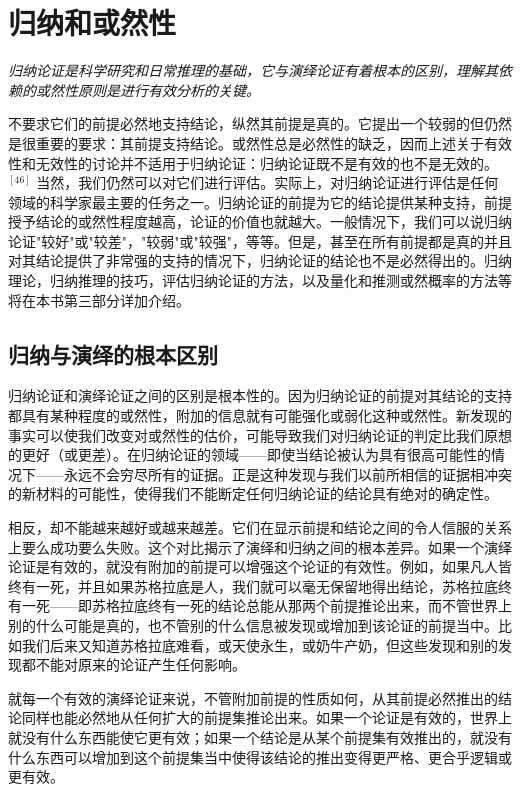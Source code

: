 \section{归纳和或然性}

\begin{logicbox}[title=引言]
\textit{归纳论证是科学研究和日常推理的基础，它与演绎论证有着根本的区别，理解其依赖的或然性原则是进行有效分析的关键。}
\end{logicbox}

不要求它们的前提必然地支持结论，纵然其前提是真的。它提出一个较弱的但仍然是很重要的要求：其前提支持结论。或然性总是必然性的缺乏，因而上述关于有效性和无效性的讨论并不适用于归纳论证：归纳论证既不是有效的也不是无效的。$^{[46]}$ 当然，我们仍然可以对它们进行评估。实际上，对归纳论证进行评估是任何领域的科学家最主要的任务之一。归纳论证的前提为它的结论提供某种支持，前提授予结论的或然性程度越高，论证的价值也就越大。一般情况下，我们可以说归纳论证"较好"或"较差"，"较弱"或"较强"，等等。但是，甚至在所有前提都是真的并且对其结论提供了非常强的支持的情况下，归纳论证的结论也不是必然得出的。归纳理论，归纳推理的技巧，评估归纳论证的方法，以及量化和推测或然概率的方法等将在本书第三部分详加介绍。

\subsection{归纳与演绎的根本区别}

归纳论证和演绎论证之间的区别是根本性的。因为归纳论证的前提对其结论的支持都具有某种程度的或然性，附加的信息就有可能强化或弱化这种或然性。新发现的事实可以使我们改变对或然性的估价，可能导致我们对归纳论证的判定比我们原想的更好（或更差）。在归纳论证的领域——即使当结论被认为具有很高可能性的情况下——永远不会穷尽所有的证据。正是这种发现与我们以前所相信的证据相冲突的新材料的可能性，使得我们不能断定任何归纳论证的结论具有绝对的确定性。

相反，却不能越来越好或越来越差。它们在显示前提和结论之间的令人信服的关系上要么成功要么失败。这个对比揭示了演绎和归纳之间的根本差异。如果一个演绎论证是有效的，就没有附加的前提可以增强这个论证的有效性。例如，如果凡人皆终有一死，并且如果苏格拉底是人，我们就可以毫无保留地得出结论，苏格拉底终有一死——即苏格拉底终有一死的结论总能从那两个前提推论出来，而不管世界上别的什么可能是真的，也不管别的什么信息被发现或增加到该论证的前提当中。比如我们后来又知道苏格拉底难看，或天使永生，或奶牛产奶，但这些发现和别的发现都不能对原来的论证产生任何影响。

就每一个有效的演绎论证来说，不管附加前提的性质如何，从其前提必然推出的结论同样也能必然地从任何扩大的前提集推论出来。如果一个论证是有效的，世界上就没有什么东西能使它更有效；如果一个结论是从某个前提集有效推出的，就没有什么东西可以增加到这个前提集当中使得该结论的推出变得更严格、更合乎逻辑或更有效。

